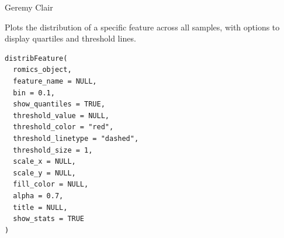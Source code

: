 \documentclass[a4paper]{book}
\begin{document}
%
\begin{Author}
Geremy Clair
\end{Author}
%
\begin{Description}
Plots the distribution of a specific feature across all samples, with options to display quartiles and threshold lines.
\end{Description}
%
\begin{Usage}
\begin{verbatim}
distribFeature(
  romics_object,
  feature_name = NULL,
  bin = 0.1,
  show_quantiles = TRUE,
  threshold_value = NULL,
  threshold_color = "red",
  threshold_linetype = "dashed",
  threshold_size = 1,
  scale_x = NULL,
  scale_y = NULL,
  fill_color = NULL,
  alpha = 0.7,
  title = NULL,
  show_stats = TRUE
)
\end{verbatim}
\end{Usage}
%
\end{document}
